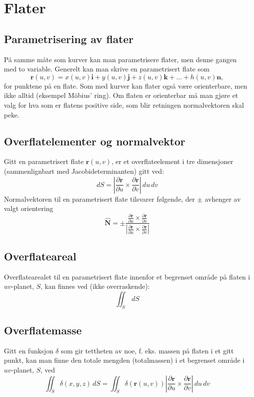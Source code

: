 \documentclass[fleqn,12pt]{wlscirep}
\begin{document}
\section{Flater}
\subsection{Parametrisering av flater}
På samme måte som kurver kan man parametrisere flater, men denne gangen med to variable. Generelt kan man skrive en parametrisert flate som
\begin{equation}
    \textbf{r}(u,v) = x(u,v)\textbf{i} + y(u,v)\textbf{j} + z(u,v)\textbf{k} + ... + h(u,v)\textbf{n},
\end{equation}
for punktene på en flate. Som med kurver kan flater også være orienterbare, men ikke alltid (eksempel Möbius' ring). Om flaten er orienterbar må man gjøre et valg for hva som er flatens positive side, som blir retningen normalvektoren skal peke.
\subsection{Overflatelementer og normalvektor}
Gitt en parametrisert flate $\textbf{r}(u,v)$, er et overflateelement i tre dimensjoner (sammenlignbart med Jacobideterminanten) gitt ved:
\begin{equation}
    dS = \left|\frac{\partial \textbf{r}}{\partial u}\times \frac{\partial \textbf{r}}{\partial v}\right|\,du\,dv
\end{equation}
Normalvektoren til en parametrisert flate tilsvarer følgende, der $\pm$ avhenger av valgt orientering
\begin{equation}
    \hat{\textbf{N}} = \pm \frac{\frac{\partial \textbf{r}}{\partial u}\times \frac{\partial \textbf{r}}{\partial v}}{\left|\frac{\partial \textbf{r}}{\partial u}\times \frac{\partial \textbf{r}}{\partial v}\right|}
\end{equation}
\subsection{Overflateareal}
Overflatearealet til en parametrisert flate innenfor et begrenset område på flaten i $uv$-planet, $S$, kan finnes ved (ikke overraskende):
\begin{equation}
    \iint_S \,dS 
\end{equation}
\subsection{Overflatemasse}
Gitt en funksjon $\delta$ som gir tettheten av noe, f. eks. massen på flaten i et gitt punkt, kan man finne den totale mengden (totalmassen) i et begrenset område i $uv$-planet, $S$, ved
\begin{equation}
    \iint_S \delta(x,y,z)\, dS =  \iint_S \delta(\textbf{r}(u,v)) \left|\frac{\partial \textbf{r}}{\partial u}\times \frac{\partial \textbf{r}}{\partial v}\right|\,du\,dv
\end{equation}
\end{document}
